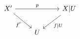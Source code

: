 \documentclass[crop,dvisvgm]{standalone}
\begin{document}
\[\begin {tikzcd}
        X' \ar [rr,"p"] \ar [dr,swap,"f'"]
        && X|U \ar [dl,"f|U"]
      \\& U
      \end {tikzcd}\]
\end{document}

